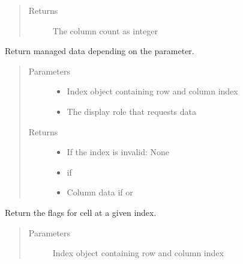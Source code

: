\documentclass[letterpaper,10pt,english]{sphinxmanual}
\begin{document}
\begin{fulllineitems}
\begin{fulllineitems}
\begin{quote}
\begin{description}
\item[{Returns}] \leavevmode
The column count as integer

\end{description}\end{quote}

\end{fulllineitems}


\begin{fulllineitems}
\label{\detokenize{src:src.PacketTableModel.PacketTableModel.data}}
Return managed data depending on the  parameter.
\begin{quote}\begin{description}
\item[{Parameters}] \leavevmode\begin{itemize}
\item {} 
 \textendash{} Index object containing row and column index

\item {} 
 \textendash{} The display role that requests data

\end{itemize}

\item[{Returns}] \leavevmode
\begin{itemize}
\item {} 
If the index is invalid: None

\item {} 
 if 

\item {} 
Column data if  or 

\end{itemize}


\end{description}\end{quote}

\end{fulllineitems}


\begin{fulllineitems}
\label{\detokenize{src:src.PacketTableModel.PacketTableModel.flags}}
Return the flags for cell at a given index.
\begin{quote}\begin{description}
\item[{Parameters}] \leavevmode
{} \textendash{} Index object containing row and column index


\end{description}
\end{quote}
\end{fulllineitems}
\end{fulllineitems}
\end{document}
